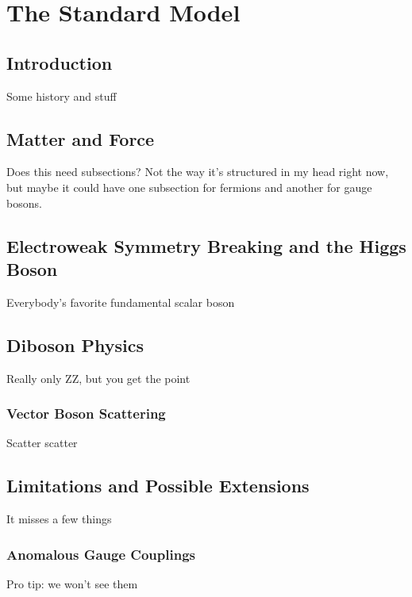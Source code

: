 

\chapter{The Standard Model}


\section{Introduction}
Some history and stuff



\section{Matter and Force}
Does this need subsections? Not the way it's structured in my head right now, but maybe it could have one subsection for fermions and another for gauge bosons.



\section{Electroweak Symmetry Breaking and the Higgs Boson}
Everybody's favorite fundamental scalar boson



\section{Diboson Physics}
Really only ZZ, but you get the point

\subsection{Vector Boson Scattering}
Scatter scatter


\section{Limitations and Possible Extensions}
It misses a few things

\subsection{Anomalous Gauge Couplings}
Pro tip: we won't see them

